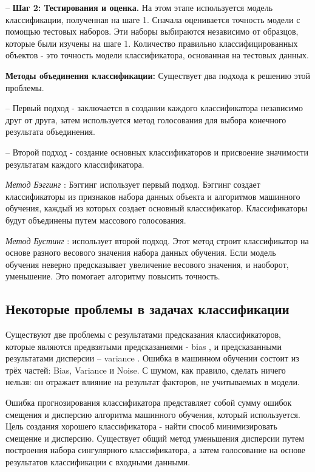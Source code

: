 \documentclass[a4paper,14pt]{extreport}
\begin{document}
-- \textbf{Шаг 2: Тестирования и оценка.} На этом этапе используется модель классификации, полученная на шаге 1. Сначала оценивается точность модели с помощью тестовых наборов. Эти наборы выбираются независимо от образцов, которые были изучены на шаге 1. Количество правильно классифицированных объектов - это точность модели классификатора, основанная на тестовых данных.

\textbf{Методы объединения классификации:} Существует два подхода к решению этой проблемы.

-- Первый подход - заключается в создании каждого классификатора независимо друг от друга, затем используется метод голосования для выбора конечного результата объединения.

-- Второй подход - создание основных классификаторов и присвоение значимости результатам каждого классификатора.

\textit{Метод Бэггинг} \cite{h54, h55}: Бэггинг использует первый подход. Бэггинг создает классификаторы из признаков набора данных объекта и алгоритмов машинного обучения, каждый из которых создает основный классификатор. Классификаторы будут объединены путем массового голосования.

\textit{Метод Бустинг} \cite{h56, h57}: использует второй подход. Этот метод строит классификатор на основе разного весового значения набора данных обучения. Если модель обучения неверно предсказывает увеличение весового значения, и наоборот, уменьшение. Это помогает алгоритму повысить точность.

\subsection{Некоторые проблемы в задачах классификации}
Существуют две проблемы с результатами предсказания классификаторов, которые являются предвзятыми предсказаниями - bias \cite{h58, h59}, и предсказанными результатами дисперсии – variance \cite{h60}. Ошибка в машинном обучении состоит из трёх частей: Bias, Variance и Noise. С шумом, как правило, сделать ничего нельзя: он отражает влияние на результат факторов, не учитываемых в модели.  

Ошибка прогнозирования классификатора представляет собой сумму ошибок смещения и дисперсию алгоритма машинного обучения, который используется. Цель создания хорошего классификатора - найти способ минимизировать смещение и дисперсию. Существует общий метод уменьшения дисперсии путем построения набора сингулярного классификатора, а затем голосование на основе результатов классификации с входными данными.
\end{document}
